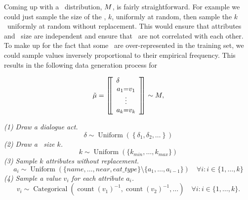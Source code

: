 Coming up with a 
\meaningrepresentation~distribution, $M$, is fairly straightforward.
For example we could just sample the size of the \meaningrepresentation, $k$,
uniformly at random, then sample the $k$ \attributes~uniformly at random 
without replacement. This would ensure that attributes and \meaningrepresentation~size are independent and ensure that \attributes~are not correlated with
each other. To make up for the fact that some \attributevalues~are over-represented in the training set, we could sample values inversely proportional
to their empirical frequency. This results in the following data generation
process for 
\begin{singlespace}\[
\tilde{\mu}  = \left[\!\!\left[ 
\begin{array}{c} 
\delta~~~~~~~ \\
\textrm{$a_1$=$v_1$} \\ \vdots \\ \textrm{$a_k$=$v_k$}  
\end{array}  
\right]\!\!\right] \sim M,\]\end{singlespace}
{
\begin{minipage}{0.9\textwidth}
\begin{singlespace}
\noindent \textit{(1) Draw a dialogue act.}
\[
  \delta \sim \operatorname{Uniform}(\left\{\delta_1, \delta_2,\ldots\right\}) 
\]
\noindent \textit{(2) Draw a \meaningrepresentation~size $k$.}
\[
  k \sim \operatorname{Uniform}(\{k_{min}, \ldots, k_{max}\}) 
\]
\noindent \textit{(3) Sample $k$ attributes without replacement.}
\[
a_i  \sim \operatorname{Uniform}(\{name, \ldots, near, eat\_type\}\setminus\{a_1,\ldots,a_{i-1}\}) \quad \forall i: i \in  \{1,\ldots, k\}\]
\noindent \textit{(4) Sample a value $v_i$ for each attribute $a_i$.}
\[ v_i  \sim \operatorname{Categorical}\left(\operatorname{count}(v_1)^{-1}, \operatorname{count}(v_2)^{-1},\ldots\right)  \quad \forall i: i \in \{1,\ldots,k\}. \]
\end{singlespace}
\end{minipage}}

